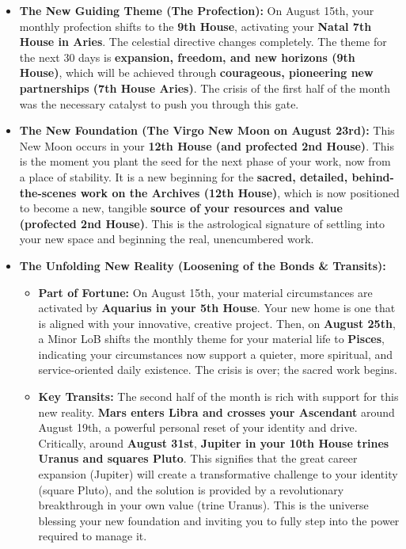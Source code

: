 \documentclass{article}
\begin{document}
\begin{itemize}
\item
  \textbf{The New Guiding Theme (The Profection):} On August 15th, your monthly profection shifts to the \textbf{9th House}, activating your \textbf{Natal 7th House in Aries}. The celestial directive changes completely. The theme for the next 30 days is \textbf{expansion, freedom, and new horizons (9th House)}, which will be achieved through \textbf{courageous, pioneering new partnerships (7th House Aries)}. The crisis of the first half of the month was the necessary catalyst to push you through this gate.
\item
  \textbf{The New Foundation (The Virgo New Moon on August 23rd):} This New Moon occurs in your \textbf{12th House (and profected 2nd House)}. This is the moment you plant the seed for the next phase of your work, now from a place of stability. It is a new beginning for the \textbf{sacred, detailed, behind-the-scenes work on the Archives (12th House)}, which is now positioned to become a new, tangible \textbf{source of your resources and value (profected 2nd House)}. This is the astrological signature of settling into your new space and beginning the real, unencumbered work.
\item
  \textbf{The Unfolding New Reality (Loosening of the Bonds \& Transits):}

  \begin{itemize}
  \tightlist
  \item
    \textbf{Part of Fortune:} On August 15th, your material circumstances are activated by \textbf{Aquarius in your 5th House}. Your new home is one that is aligned with your innovative, creative project. Then, on \textbf{August 25th}, a Minor LoB shifts the monthly theme for your material life to \textbf{Pisces}, indicating your circumstances now support a quieter, more spiritual, and service-oriented daily existence. The crisis is over; the sacred work begins.
  \item
    \textbf{Key Transits:} The second half of the month is rich with support for this new reality. \textbf{Mars enters Libra and crosses your Ascendant} around August 19th, a powerful personal reset of your identity and drive. Critically, around \textbf{August 31st}, \textbf{Jupiter in your 10th House trines Uranus and squares Pluto}. This signifies that the great career expansion (Jupiter) will create a transformative challenge to your identity (square Pluto), and the solution is provided by a revolutionary breakthrough in your own value (trine Uranus). This is the universe blessing your new foundation and inviting you to fully step into the power required to manage it.
  \end{itemize}
\end{itemize}
\end{document}
